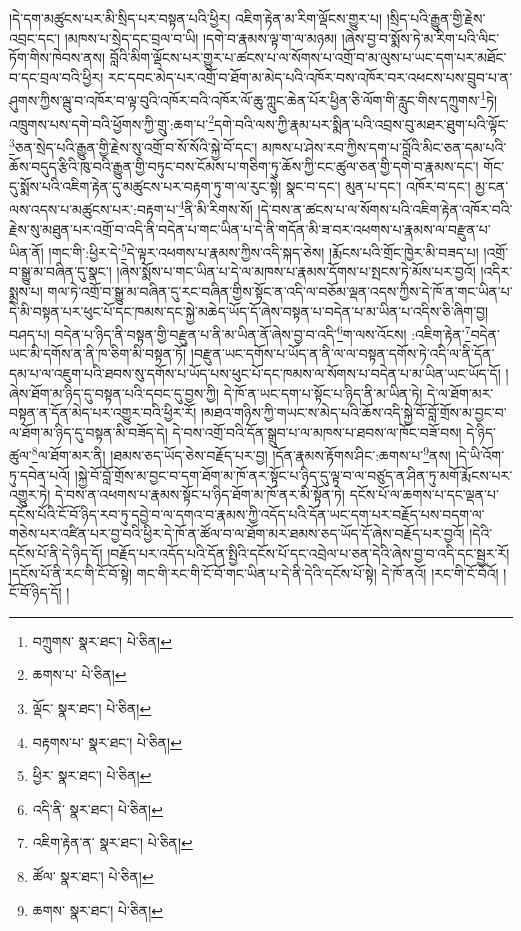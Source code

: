 །དེ་དག་མཚུངས་པར་མི་སྲིད་པར་བསྟན་པའི་ཕྱིར། འཇིག་རྟེན་མ་རིག་ལྡོངས་གྱུར་པ། །སྲིད་པའི་རྒྱུན་གྱི་རྗེས་འབྲང་དང་། །མཁས་པ་སྲེད་དང་བྲལ་བ་ཡི། །དགེ་བ་རྣམས་ལྟ་ག་ལ་མཉམ། །ཞེས་བྱ་བ་སྨོས་ཏེ་མ་རིག་པའི་ལིང་ཏོག་གིས་ཁེབས་ནས། བློའི་མིག་ལྡོངས་པར་གྱུར་པ་ཚངས་པ་ལ་སོགས་པ་འགྲོ་བ་མ་ལུས་པ་ཡང་དག་པར་མཐོང་བ་དང་བྲལ་བའི་ཕྱིར། རང་དབང་མེད་པར་འགྲོ་བ་ཐོག་མ་མེད་པའི་འཁོར་བས་འཁོར་བར་འཕངས་པས་བྲུབ་པ་ན་ཤུགས་ཀྱིས་ལྦུ་བ་འཁོར་བ་ལྟ་བུའི་འཁོར་བའི་འཁོར་ལོ་ཆུ་ཀླུང་ཆེན་པོར་ཕྱིན་ཅི་ལོག་གི་རླུང་གིས་དཀྲུགས་\footnote{བཀྲུགས་  སྣར་ཐང་།  པེ་ཅིན། }ཏེ། འཁྲུགས་པས་དགེ་བའི་ཕྱོགས་ཀྱི་གྲུ་:ཆག་པ་\footnote{ཆགས་པ་  པེ་ཅིན། }དགེ་བའི་ལས་ཀྱི་རྣམ་པར་སྨིན་པའི་འབྲས་བུ་མཐར་ཐུག་པའི་ལྟོང་\footnote{ལྡོང་  སྣར་ཐང་།  པེ་ཅིན། }ཅན་སྲེད་པའི་རྒྱུན་གྱི་རྗེས་སུ་འགྲོ་བ་སོ་སོའི་སྐྱེ་བོ་དང་། མཁས་པ་ཤེས་རབ་ཀྱིས་དག་པ་བློའི་མིང་ཅན་དམ་པའི་ཆོས་བདུད་རྩིའི་ཁུ་བའི་རྒྱུན་གྱི་བཏུང་བས་ངོམས་པ་གཅིག་ཏུ་ཆོས་ཀྱི་ངང་ཚུལ་ཅན་གྱི་དགེ་བ་རྣམས་དང་། གོང་དུ་སྨོས་པའི་འཇིག་རྟེན་དུ་མཚུངས་པར་བརྟག་ཏུ་ག་ལ་རུང་སྟེ། སྣང་བ་དང་། མུན་པ་དང་། འཁོར་བ་དང་། མྱ་ངན་ལས་འདས་པ་མཚུངས་པར་:བརྟག་པ་\footnote{བརྟགས་པ་  སྣར་ཐང་།  པེ་ཅིན། }ནི་མི་རིགས་སོ། །དེ་བས་ན་ཚངས་པ་ལ་སོགས་པའི་འཇིག་རྟེན་འཁོར་བའི་རྗེས་སུ་མཐུན་པར་འགྲོ་བ་འདི་ནི་བདེན་པ་གང་ཡིན་པ་དེ་ནི་གདོན་མི་ཟ་བར་འཕགས་པ་རྣམས་ལ་བརྫུན་པ་ཡིན་ནོ། །གང་གི་:ཕྱིར་དེ་\footnote{ཕྱིར་  སྣར་ཐང་།  པེ་ཅིན། }དེ་ལྟར་འཕགས་པ་རྣམས་ཀྱིས་འདི་སྐད་ཅེས། །རྨོངས་པའི་གྲོང་ཁྱེར་མི་བཟད་པ། །འགྲོ་བ་སྒྱུ་མ་བཞིན་དུ་སྣང་། །ཞེས་སྨོས་པ་གང་ཡིན་པ་དེ་ལ་མཁས་པ་རྣམས་དོགས་པ་སྤངས་ཏེ་མོས་པར་བྱའོ། །འདིར་སྨྲས་པ། གལ་ཏེ་འགྲོ་བ་སྒྱུ་མ་བཞིན་དུ་རང་བཞིན་གྱིས་སྟོང་ན་འདི་ལ་བཅོམ་ལྡན་འདས་ཀྱིས་དེ་ཁོ་ན་གང་ཡིན་པ་དེ་མི་བསྟན་པར་ཕུང་པོ་དང་ཁམས་དང་སྐྱེ་མཆེད་ཡོད་དོ་ཞེས་བསྟན་པ་བདེན་པ་མ་ཡིན་པ་འདིས་ཅི་ཞིག་བྱ། བཤད་པ། བདེན་པ་ཉིད་ནི་བསྟན་གྱི་བརྫུན་པ་ནི་མ་ཡིན་ནོ་ཞེས་བྱ་བ་འདི་\footnote{འདི་ནི་  སྣར་ཐང་།  པེ་ཅིན། }ག་ལས་འོངས། :འཇིག་རྟེན་\footnote{འཇིག་རྟེན་ན་  སྣར་ཐང་།  པེ་ཅིན། }བདེན་ཡང་མི་དགོས་ན་ནི་ཁ་ཅིག་མི་བསྟན་ཏོ། །བརྫུན་ཡང་དགོས་པ་ཡོད་ན་ནི་ལ་ལ་བསྟན་དགོས་ཏེ་འདི་ལ་ནི་དོན་དམ་པ་ལ་འཇུག་པའི་ཐབས་སུ་དགོས་པ་ཡོད་པས་ཕུང་པོ་དང་ཁམས་ལ་སོགས་པ་བདེན་པ་མ་ཡིན་ཡང་ཡོད་དོ། །ཞེས་ཐོག་མ་ཉིད་དུ་བསྟན་པའི་དབང་དུ་བྱས་ཀྱི། དེ་ཁོ་ན་ཡང་དག་པ་སྟོང་པ་ཉིད་ནི་མ་ཡིན་ཏེ། དེ་ལ་ཐོག་མར་བསྟན་ན་དོན་མེད་པར་འགྱུར་བའི་ཕྱིར་རོ། །མཐའ་གཉིས་ཀྱི་གཡང་ས་མེད་པའི་ཆོས་འདི་སྐྱེ་བོ་བློ་གྲོས་མ་བྱང་བ་ལ་ཐོག་མ་ཉིད་དུ་བསྟན་མི་བཟོད་དེ། དེ་བས་འགྲོ་བའི་དོན་སྒྲུབ་པ་ལ་མཁས་པ་ཐབས་ལ་ཁོང་བཟོ་བས། དེ་ཉིད་ཚུལ་\footnote{ཚོལ་  སྣར་ཐང་།  པེ་ཅིན། }ལ་ཐོག་མར་ནི། །ཐམས་ཅད་ཡོད་ཅེས་བརྗོད་པར་བྱ། །དོན་རྣམས་རྟོགས་ཤིང་:ཆགས་པ་\footnote{ཆགས་  སྣར་ཐང་།  པེ་ཅིན། }ནས། །དེ་ཡི་འོག་ཏུ་དབེན་པའོ། །སྐྱེ་བོ་བློ་གྲོས་མ་བྱང་བ་དག་ཐོག་མ་ཁོ་ནར་སྟོང་པ་ཉིད་དུ་ལྟ་བ་ལ་བཙུད་ན་ཤིན་ཏུ་མགོ་རྨོངས་པར་འགྱུར་ཏེ། དེ་བས་ན་འཕགས་པ་རྣམས་སྟོང་པ་ཉིད་ཐོག་མ་ཁོ་ནར་མི་སྟོན་ཏེ། དངོས་པོ་ལ་ཆགས་པ་དང་ལྡན་པ་དངོས་པོའི་ངོ་བོ་ཉིད་རབ་ཏུ་དབྱེ་བ་ལ་དགའ་བ་རྣམས་ཀྱི་འདོད་པའི་དོན་ཡང་དག་པར་བརྗོད་པས་བདག་ལ་གཅེས་པར་འཛིན་པར་བྱ་བའི་ཕྱིར་དེ་ཁོ་ན་ཚོལ་བ་ལ་ཐོག་མར་ཐམས་ཅད་ཡོད་དོ་ཞེས་བརྗོད་པར་བྱའོ། །དེའི་དངོས་པོ་ནི་དེ་ཉིད་དོ། །བརྗོད་པར་འདོད་པའི་དོན་སྤྱིའི་དངོས་པོ་དང་འབྲེལ་པ་ཅན་དེའི་ཞེས་བྱ་བ་འདི་དང་སྦྱར་རོ། །དངོས་པོ་ནི་རང་གི་ངོ་བོ་སྟེ། གང་གི་རང་གི་ངོ་བོ་གང་ཡིན་པ་དེ་ནི་དེའི་དངོས་པོ་སྟེ། དེ་ཁོ་ནའོ། །རང་གི་ངོ་བོའོ། །ངོ་བོ་ཉིད་དོ། །
